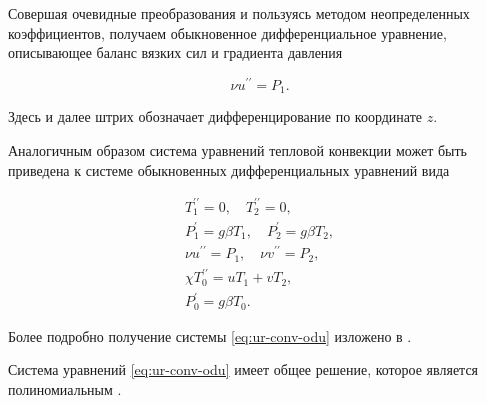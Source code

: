 Совершая очевидные преобразования и пользуясь методом неопределенных коэффициентов, получаем обыкновенное дифференциальное уравнение, описывающее баланс вязких сил и градиента давления 

$$\displaystyle

 \nu u^{\prime\prime}=P_1.$$

Здесь и далее штрих обозначает дифференцирование по координате $z$.



Аналогичным образом система уравнений тепловой конвекции  может быть приведена к системе обыкновенных дифференциальных уравнений вида

\begin{gather}%

 T_1^{\prime\prime}=0,   \quad   T_2^{\prime\prime}=0,\\



P_1^{\prime}=g\beta T_1,  \quad  P_2^{\prime}=g\beta T_2,  \\



\label{eq:ur-conv-odu}%

 \nu u^{\prime\prime}=P_1,  \quad   \nu v^{\prime\prime}=P_2,\\



\chi T_0^{\prime\prime}=u T_1+v T_2,\\



 P_0^{\prime}=g\beta T_0.

\end{gather}



Более подробно получение системы \eqref{eq:ur-conv-odu} изложено в \cite{Burm_Pros_Samara}.

Система уравнений \eqref{eq:ur-conv-odu} имеет общее решение, которое является полиномиальным \cite{Aristov_Pros5, Aristov_Pros7, Aristov_Pros_Spev1, Aristov_Pros_Spev2, Burm_Pros_Samara, Burm_Pros_IOP,Burm_Pros_DREAM,Burm_Pros_AIP,Gorsh_Pros1}.

